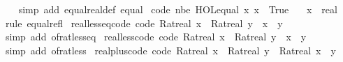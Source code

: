 \begin{isabellebody}
%
\isadelimproof
\ \ %
\endisadelimproof
%
\isatagproof
{}\isamarkupfalse%
\ {\isacharparenleft}{\kern0pt}simp\ add{\isacharcolon}{\kern0pt}\ equal{\isacharunderscore}{\kern0pt}real{\isacharunderscore}{\kern0pt}def\ equal{\isacharparenright}{\kern0pt}%
\endisatagproof
{\isafoldproof}%
%
\isadelimproof
\isanewline
%
\endisadelimproof
\isanewline
{}\isamarkupfalse%
\ {\isacharbrackleft}{\kern0pt}code\ nbe{\isacharbrackright}{\kern0pt}{\isacharcolon}{\kern0pt}\ {\isachardoublequoteopen}HOL{\isachardot}{\kern0pt}equal\ x\ x\ {\isasymlongleftrightarrow}\ True{\isachardoublequoteclose}\isanewline
\ \ \ x\ {\isacharcolon}{\kern0pt}{\isacharcolon}{\kern0pt}\ real\isanewline
%
\isadelimproof
\ \ %
\endisadelimproof
%
\isatagproof
{}\isamarkupfalse%
\ {\isacharparenleft}{\kern0pt}rule\ equal{\isacharunderscore}{\kern0pt}refl{\isacharparenright}{\kern0pt}%
\endisatagproof
{\isafoldproof}%
%
\isadelimproof
\isanewline
%
\endisadelimproof
\isanewline
{}\isamarkupfalse%
\isanewline
\isanewline
{}\isamarkupfalse%
\ real{\isacharunderscore}{\kern0pt}less{\isacharunderscore}{\kern0pt}eq{\isacharunderscore}{\kern0pt}code\ {\isacharbrackleft}{\kern0pt}code{\isacharbrackright}{\kern0pt}{\isacharcolon}{\kern0pt}\ {\isachardoublequoteopen}Ratreal\ x\ {\isasymle}\ Ratreal\ y\ {\isasymlongleftrightarrow}\ x\ {\isasymle}\ y{\isachardoublequoteclose}\isanewline
%
\isadelimproof
\ \ %
\endisadelimproof
%
\isatagproof
{}\isamarkupfalse%
\ {\isacharparenleft}{\kern0pt}simp\ add{\isacharcolon}{\kern0pt}\ of{\isacharunderscore}{\kern0pt}rat{\isacharunderscore}{\kern0pt}less{\isacharunderscore}{\kern0pt}eq{\isacharparenright}{\kern0pt}%
\endisatagproof
{\isafoldproof}%
%
\isadelimproof
\isanewline
%
\endisadelimproof
\isanewline
{}\isamarkupfalse%
\ real{\isacharunderscore}{\kern0pt}less{\isacharunderscore}{\kern0pt}code\ {\isacharbrackleft}{\kern0pt}code{\isacharbrackright}{\kern0pt}{\isacharcolon}{\kern0pt}\ {\isachardoublequoteopen}Ratreal\ x\ {\isacharless}{\kern0pt}\ Ratreal\ y\ {\isasymlongleftrightarrow}\ x\ {\isacharless}{\kern0pt}\ y{\isachardoublequoteclose}\isanewline
%
\isadelimproof
\ \ %
\endisadelimproof
%
\isatagproof
{}\isamarkupfalse%
\ {\isacharparenleft}{\kern0pt}simp\ add{\isacharcolon}{\kern0pt}\ of{\isacharunderscore}{\kern0pt}rat{\isacharunderscore}{\kern0pt}less{\isacharparenright}{\kern0pt}%
\endisatagproof
{\isafoldproof}%
%
\isadelimproof
\isanewline
%
\endisadelimproof
\isanewline
{}\isamarkupfalse%
\ real{\isacharunderscore}{\kern0pt}plus{\isacharunderscore}{\kern0pt}code\ {\isacharbrackleft}{\kern0pt}code{\isacharbrackright}{\kern0pt}{\isacharcolon}{\kern0pt}\ {\isachardoublequoteopen}Ratreal\ x\ {\isacharplus}{\kern0pt}\ Ratreal\ y\ {\isacharequal}{\kern0pt}\ Ratreal\ {\isacharparenleft}{\kern0pt}x\ {\isacharplus}{\kern0pt}\ y{\isacharparenright}{\kern0pt}{\isachardoublequoteclose}\isanewline

\end{isabellebody}
